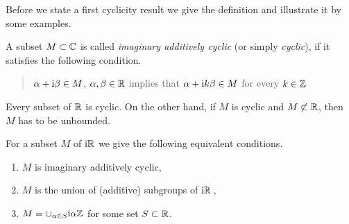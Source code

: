 Before we state a first cyclicity result we give the definition and illustrate it by some examples.
\begin{definition}\label{def:b3-2.5}
A subset $M \subset \mathbb{C}$ is called \emph{imaginary additively cyclic} (or simply \emph{cyclic}), if it satisfies the following condition. 
\begin{quote}
$\alpha + \mathrm{i}\beta \in M$, $\alpha,\beta \in \mathbb{R}$ implies that $\alpha +  \mathrm{i} k\beta \in M$ for every $k \in \mathbb{Z}$\,
\end{quote}
\end{definition}
Every subset of $\mathbb{R}$ is cyclic. 
On the other hand, if $M$ is cyclic and $M \not\subset \mathbb{R}$, then $M$ has to be unbounded.
	
For a subset $M$ of $\mathrm{i} \mathbb{R}$ we give the following equivalent conditions.
	\begin{enumerate}[\upshape (a)]
		\item 
		$M$ is imaginary additively cyclic,
		
		\item 
		$M$ is the union of (additive) subgroups of $\mathrm{i} \mathbb{R}$\,,
		
		\item 
		$M = \cup_{\alpha \in S} \mathrm{i}\alpha\mathbb{Z}$ for some set $S \subset \mathbb{R}$.
	\end{enumerate}
	
